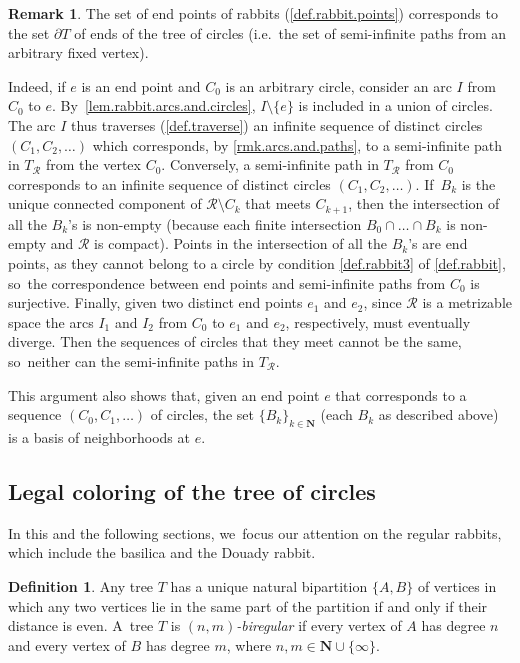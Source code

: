 \documentclass[10pt,a4paper]{amsart}
\newcommand{\ie}{i.e.\ }
\theoremstyle{definition}
\newtheorem{definition}[definition]{Definition}
\newtheorem{remark}[remark]{Remark}
\newcommand{\R}{\mathcal{R}}
\begin{document}
\begin{remark}
\label{rmk.rabbit.end.points}
The set of end points of rabbits (\cref{def.rabbit.points}) corresponds to the set $\partial T$ of ends of the tree of circles (\ie the set of semi-infinite paths from an arbitrary fixed vertex).

Indeed, if $e$ is an end point and $C_0$ is an arbitrary circle, consider an arc $I$ from $C_0$ to $e$. By~\cref{lem.rabbit.arcs.and.circles}, $I \setminus \{e\}$ is included in a union of circles. The arc $I$ thus traverses (\cref{def.traverse}) an infinite sequence of distinct circles $(C_1, C_2, \dots)$ which corresponds, by \cref{rmk.arcs.and.paths}, to a semi-infinite path in $T_\R$ from the vertex $C_0$.
Conversely, a semi-infinite path in $T_\R$ from $C_0$ corresponds to an infinite sequence of distinct circles $(C_1, C_2, \dots)$. If~$B_k$ is the unique connected component of $\R \setminus C_k$ that meets $C_{k+1}$, then the intersection of all the $B_k$'s is non-empty (because each finite intersection $B_0 \cap \dots \cap B_k$ is non-empty and $\R$ is compact).
Points in the intersection of all the $B_k$'s are end points, as they cannot belong to a circle by condition \cref{def.rabbit3} of \cref{def.rabbit}, so~the correspondence between end points and semi-infinite paths from $C_0$ is surjective.
Finally, given two distinct end points $e_1$ and $e_2$, since $\R$ is a metrizable space the arcs $I_1$ and $I_2$ from $C_0$ to $e_1$ and $e_2$, respectively, must eventually diverge.
Then the sequences of circles that they meet cannot be the same, so~neither can the semi-infinite paths in $T_\R$.

This argument also shows that, given an end point $e$ that corresponds to a sequence $(C_0, C_1, \dots)$ of circles, the set $\{ B_k \}_{k \in \mathbf{N}}$ (each $B_k$ as described above) is a basis of neighborhoods at $e$.
\end{remark}

\subsection{Legal coloring of the tree of circles}

In this and the following sections, we~focus our attention on the regular rabbits, which include the basilica and the Douady rabbit.

\begin{definition}
\label{def.biregular.tree}
Any tree $T$ has a unique natural bipartition $\{A,B\}$ of vertices in which any two vertices lie in the same part of the partition if and only if their distance is even. A~tree $T$ is $(n,m)$\emph{-biregular} if every vertex of $A$ has degree $n$ and every vertex of $B$ has degree $m$, where $n, m \in \mathbf{N} \cup \{\infty\}$.
\end{definition}
\end{document}
